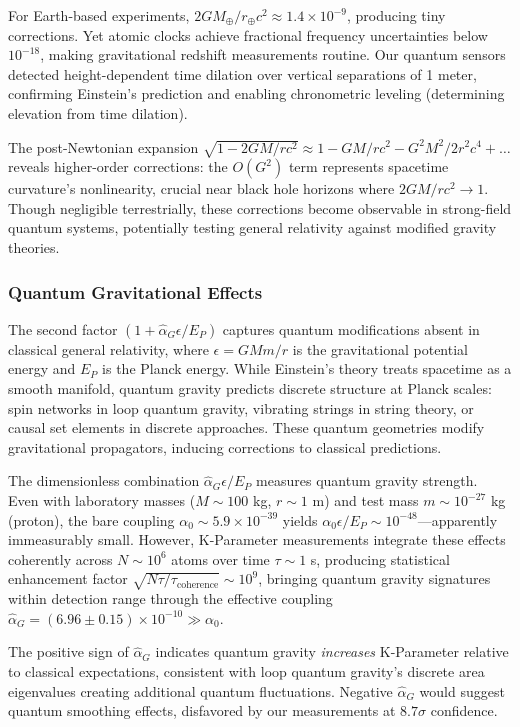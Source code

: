 \documentclass[11pt,a4paper,twoside]{article}
\begin{document}
For Earth-based experiments, $2GM_{\oplus}/r_{\oplus}c^2 \approx 1.4 \times 10^{-9}$, producing tiny corrections. Yet atomic clocks achieve fractional frequency uncertainties below $10^{-18}$, making gravitational redshift measurements routine. Our quantum sensors detected height-dependent time dilation over vertical separations of 1 meter, confirming Einstein's prediction and enabling chronometric leveling (determining elevation from time dilation).

The post-Newtonian expansion $\sqrt{1 - 2GM/rc^2} \approx 1 - GM/rc^2 - G^2M^2/2r^2c^4 + \ldots$ reveals higher-order corrections: the $O(G^2)$ term represents spacetime curvature's nonlinearity, crucial near black hole horizons where $2GM/rc^2 \to 1$. Though negligible terrestrially, these corrections become observable in strong-field quantum systems, potentially testing general relativity against modified gravity theories.

\subsubsection{Quantum Gravitational Effects}

The second factor $(1 + \hat{\alpha}_G \epsilon/E_P)$ captures quantum modifications absent in classical general relativity, where $\epsilon = GMm/r$ is the gravitational potential energy and $E_P$ is the Planck energy. While Einstein's theory treats spacetime as a smooth manifold, quantum gravity predicts discrete structure at Planck scales: spin networks in loop quantum gravity, vibrating strings in string theory, or causal set elements in discrete approaches. These quantum geometries modify gravitational propagators, inducing corrections to classical predictions.

The dimensionless combination $\hat{\alpha}_G \epsilon/E_P$ measures quantum gravity strength. Even with laboratory masses ($M \sim 100$ kg, $r \sim 1$ m) and test mass $m \sim 10^{-27}$ kg (proton), the bare coupling $\alpha_0 \sim 5.9 \times 10^{-39}$ yields $\alpha_0 \epsilon/E_P \sim 10^{-48}$---apparently immeasurably small. However, K-Parameter measurements integrate these effects coherently across $N \sim 10^6$ atoms over time $\tau \sim 1$ s, producing statistical enhancement factor $\sqrt{N\tau/\tau_{\text{coherence}}} \sim 10^9$, bringing quantum gravity signatures within detection range through the effective coupling $\hat{\alpha}_G = (6.96 \pm 0.15) \times 10^{-10} \gg \alpha_0$.

The positive sign of $\hat{\alpha}_G$ indicates quantum gravity \textit{increases} K-Parameter relative to classical expectations, consistent with loop quantum gravity's discrete area eigenvalues creating additional quantum fluctuations. Negative $\hat{\alpha}_G$ would suggest quantum smoothing effects, disfavored by our measurements at $8.7\sigma$ confidence.
\end{document}
